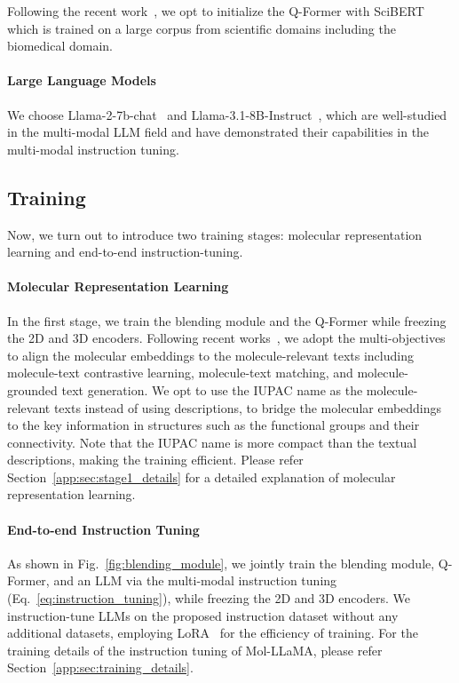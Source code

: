Following the recent work~\cite{li2024molm}, we opt to initialize the Q-Former with SciBERT~\cite{beltagy2019scibert} which is trained on a large corpus from scientific domains including the biomedical domain.

\vspace{-0.05in}
\paragraph{Large Language Models} We choose Llama-2-7b-chat~\cite{touvron2023llama2} and Llama-3.1-8B-Instruct~\cite{grattafiori2024llama3}, which are well-studied in the multi-modal LLM field and have demonstrated their capabilities in the multi-modal instruction tuning.

\vspace{-0.06in}
\subsection{Training}
\vspace{-0.06in}
Now, we turn out to introduce two training stages: molecular representation learning and end-to-end instruction-tuning.

\vspace{-0.06in}
\paragraph{Molecular Representation Learning}
In the first stage, we train the blending module and the Q-Former while freezing the 2D and 3D encoders. Following recent works~\cite{li2023BLIP2,li2024molm}, we adopt the multi-objectives to align the molecular embeddings to the molecule-relevant texts including molecule-text contrastive learning, molecule-text matching, and molecule-grounded text generation. We opt to use the IUPAC name as the molecule-relevant texts instead of using descriptions, to bridge the molecular embeddings to the key information in structures such as the functional groups and their connectivity. Note that the IUPAC name is more compact than the textual descriptions, making the training efficient. Please refer Section~\ref{app:sec:stage1_details} for a detailed explanation of molecular representation learning.

\vspace{-0.05in}
\paragraph{End-to-end Instruction Tuning}
As shown in Fig.~\ref{fig:blending_module}, we jointly train the blending module, Q-Former, and an LLM via the multi-modal instruction tuning (Eq.~\ref{eq:instruction_tuning}), while freezing the 2D and 3D encoders. We instruction-tune LLMs on the proposed instruction dataset without any additional datasets, employing LoRA~\cite{hu2021lora} for the efficiency of training. For the training details of the instruction tuning of Mol-LLaMA, please refer Section~\ref{app:sec:training_details}.